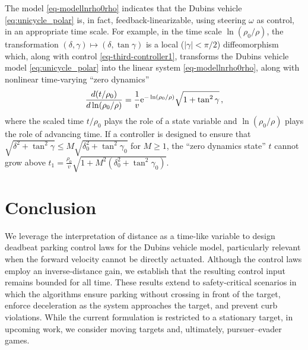 \documentclass[letterpaper, 10 pt, conference]{ieeeconf}  %
\begin{document}
The model \eqref{eq-modellnrho0rho} indicates that the Dubins vehicle \eqref{eq:unicycle_polar} is, in fact, feedback-linearizable, using steering $\omega$ as control, in an appropriate time scale. For example, in the time scale $\ln(\rho_0/\rho)$, the transformation $(\delta,\gamma)\mapsto (\delta,\tan\gamma)$ is a local ($|\gamma|<\pi/2$) diffeomorphism which, along with control \eqref{eq-third-controller1}, transforms the Dubins vehicle model \eqref{eq:unicycle_polar} into the linear system \eqref{eq-modellnrho0rho}, along with nonlinear time-varying ``zero dynamics''
\begin{equation}
\dfrac{d(t/\rho_0)}{d\ln(\rho_0/\rho)} = \frac{1}{v}{\rm e}^{-\ln(\rho_0/\rho)} \sqrt{1+\tan^2\gamma}\,,
\end{equation}
where the scaled time $t/\rho_0$ plays the role of a state variable and $\ln(\rho_0/\rho)$ plays the role of advancing time. If a controller is designed to ensure that $\sqrt{\delta^2+\tan^2\gamma}\leq M \sqrt{\delta_0^2+\tan^2\gamma_0} $ for $M\geq 1$, the ``zero dynamics state'' $t$ cannot grow above $t_1 =\frac{\rho_0}{v}\sqrt{1+M^2(\delta_0^2+\tan^2\gamma_0)}$. 


\section{Conclusion}

We leverage the interpretation of distance as a time-like variable to design deadbeat parking control laws for the Dubins vehicle model, particularly relevant when the forward velocity cannot be directly actuated. Although the control laws employ an inverse-distance gain, we establish that the resulting control input remains bounded for all time. These results extend to safety-critical scenarios in which the algorithms ensure parking without crossing in front of the target, enforce deceleration as the system approaches the target, and prevent curb violations. While the current formulation is restricted to a stationary target, in upcoming work, we consider moving targets and, ultimately, pursuer–evader games.

\end{document}
